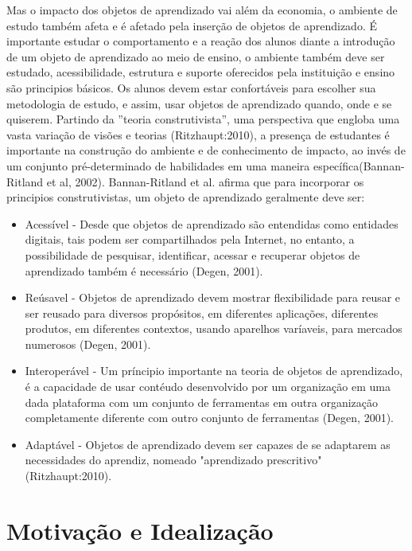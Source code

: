\documentclass[12pt,openright,oneside,a4paper,english,french,spanish,brazil]{unifil}
\begin{document}
Mas o impacto dos objetos de aprendizado vai além da economia, o ambiente de estudo também afeta e é afetado pela inserção de objetos de aprendizado. É importante estudar o comportamento e a reação dos alunos diante a introdução de um objeto de aprendizado ao meio de ensino, o ambiente também deve ser estudado, acessibilidade, estrutura e suporte oferecidos pela instituição e ensino são principios básicos. Os  alunos devem estar confortáveis para escolher sua metodologia de estudo, e assim, usar objetos de aprendizado quando, onde e se quiserem. Partindo da ''teoria construtivista'', uma perspectiva que engloba uma vasta variação de visões e teorias (Ritzhaupt:2010), a presença de estudantes é importante na construção do ambiente e de conhecimento de impacto, ao invés de um conjunto pré-determinado de habilidades em uma maneira específica(Bannan-Ritland et al, 2002). Bannan-Ritland et al. afirma que para incorporar os principios construtivistas, um objeto de aprendizado geralmente deve ser:
\begin{itemize}
\item Acessível - Desde que objetos de aprendizado são entendidas como entidades digitais, tais podem ser compartilhados pela Internet, no entanto, a possibilidade de pesquisar, identificar, acessar e recuperar objetos de aprendizado também é necessário (Degen, 2001).
\item Reúsavel - Objetos de aprendizado devem mostrar flexibilidade para reusar e ser reusado para diversos propósitos, em diferentes aplicações, diferentes produtos, em diferentes contextos, usando aparelhos varíaveis, para mercados numerosos (Degen, 2001).
\item Interoperável - Um príncipio importante na teoria de objetos de aprendizado, é a capacidade de usar contéudo desenvolvido por um organização em uma dada plataforma com um conjunto de ferramentas em outra organização completamente diferente com outro conjunto de ferramentas (Degen, 2001).
\item Adaptável - Objetos de aprendizado devem ser capazes de se adaptarem as necessidades do aprendiz, nomeado "aprendizado prescritivo" (Ritzhaupt:2010).
\end{itemize}


%

\chapter{Motivação e Idealização}%
\end{document}

